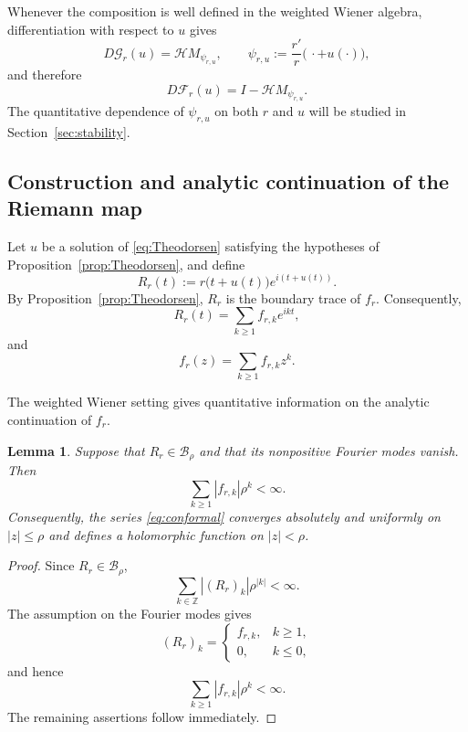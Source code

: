 \documentclass[11pt,a4paper]{amsart}
\newtheorem{lemma}[theorem]{Lemma}
\begin{document}
Whenever the composition is well defined in the weighted Wiener
algebra, differentiation with respect to $u$ gives
\begin{equation}\label{eq:DG}
	D\mathcal G_r(u)
	=
	\mathcal H M_{\psi_{r,u}},
	\qquad
	\psi_{r,u}
	:=
	\frac{r'}{r}
	\bigl(\,\cdot+u(\cdot)\bigr),
\end{equation}
and therefore
\begin{equation}\label{eq:DF}
	D\mathcal F_r(u)
	=
	I-\mathcal H M_{\psi_{r,u}}.
\end{equation}
The quantitative dependence of $\psi_{r,u}$ on both $r$ and $u$ will
be studied in Section~\ref{sec:stability}.


\subsection{Construction and analytic continuation of the Riemann map}

Let $u$ be a solution of \eqref{eq:Theodorsen} satisfying the
hypotheses of Proposition~\ref{prop:Theodorsen}, and define
\begin{equation}\label{eq:Rboundary}
	R_r(t)
	:=
	r\bigl(t+u(t)\bigr)e^{i(t+u(t))}.
\end{equation}
By Proposition~\ref{prop:Theodorsen}, $R_r$ is the boundary trace of
$f_r$. Consequently,
\begin{equation}\label{eq:RFourier}
	R_r(t)
	=
	\sum_{k\ge1}f_{r,k}e^{ikt},
\end{equation}
and
\begin{equation}\label{eq:conformal}
	f_r(z)
	=
	\sum_{k\ge1}f_{r,k}z^k.
\end{equation}

The weighted Wiener setting gives quantitative information on the
analytic continuation of $f_r$.

\begin{lemma}\label{lem:conformalradius}
	Suppose that $R_r\in\mathcal B_\rho$ and that its nonpositive Fourier
	modes vanish. Then
	\[
	\sum_{k\ge1}|f_{r,k}|\rho^k<\infty.
	\]
	Consequently, the series \eqref{eq:conformal} converges absolutely and
	uniformly on $|z|\le\rho$ and defines a holomorphic function on
	$|z|<\rho$.
\end{lemma}

\begin{proof}
	Since $R_r\in\mathcal B_\rho$,
	\[
	\sum_{k\in\mathbb Z}|(R_r)_k|\rho^{|k|}<\infty.
	\]
	The assumption on the Fourier modes gives
	\[
	(R_r)_k=
	\begin{cases}
		f_{r,k},&k\ge1,\\
		0,&k\le0,
	\end{cases}
	\]
	and hence
	\[
	\sum_{k\ge1}|f_{r,k}|\rho^k<\infty.
	\]
	The remaining assertions follow immediately.
\end{proof}
\end{document}

